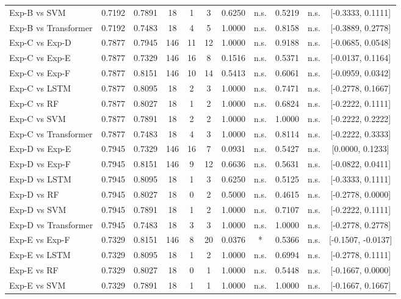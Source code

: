 \begin{table}[htbp]
{\begin{tabular}{l cc c cc cc cc c}
  Exp-B vs SVM & 0.7192 & 0.7891 & 18 & 1 & 3 & 0.6250 & n.s. & 0.5219 & n.s. & [-0.3333, 0.1111] \\
  Exp-B vs Transformer & 0.7192 & 0.7483 & 18 & 4 & 5 & 1.0000 & n.s. & 0.8158 & n.s. & [-0.3889, 0.2778] \\
  Exp-C vs Exp-D & 0.7877 & 0.7945 & 146 & 11 & 12 & 1.0000 & n.s. & 0.9188 & n.s. & [-0.0685, 0.0548] \\
  Exp-C vs Exp-E & 0.7877 & 0.7329 & 146 & 16 & 8 & 0.1516 & n.s. & 0.5371 & n.s. & [-0.0137, 0.1164] \\
  Exp-C vs Exp-F & 0.7877 & 0.8151 & 146 & 10 & 14 & 0.5413 & n.s. & 0.6061 & n.s. & [-0.0959, 0.0342] \\
  Exp-C vs LSTM & 0.7877 & 0.8095 & 18 & 2 & 3 & 1.0000 & n.s. & 0.7471 & n.s. & [-0.2778, 0.1667] \\
  Exp-C vs RF & 0.7877 & 0.8027 & 18 & 1 & 2 & 1.0000 & n.s. & 0.6824 & n.s. & [-0.2222, 0.1111] \\
  Exp-C vs SVM & 0.7877 & 0.7891 & 18 & 2 & 2 & 1.0000 & n.s. & 1.0000 & n.s. & [-0.2222, 0.2222] \\
  Exp-C vs Transformer & 0.7877 & 0.7483 & 18 & 4 & 3 & 1.0000 & n.s. & 0.8114 & n.s. & [-0.2222, 0.3333] \\
  Exp-D vs Exp-E & 0.7945 & 0.7329 & 146 & 16 & 7 & 0.0931 & n.s. & 0.5427 & n.s. & [0.0000, 0.1233] \\
  Exp-D vs Exp-F & 0.7945 & 0.8151 & 146 & 9 & 12 & 0.6636 & n.s. & 0.5631 & n.s. & [-0.0822, 0.0411] \\
  Exp-D vs LSTM & 0.7945 & 0.8095 & 18 & 1 & 3 & 0.6250 & n.s. & 0.5125 & n.s. & [-0.3333, 0.1111] \\
  Exp-D vs RF & 0.7945 & 0.8027 & 18 & 0 & 2 & 0.5000 & n.s. & 0.4615 & n.s. & [-0.2778, 0.0000] \\
  Exp-D vs SVM & 0.7945 & 0.7891 & 18 & 1 & 2 & 1.0000 & n.s. & 0.7107 & n.s. & [-0.2222, 0.1111] \\
  Exp-D vs Transformer & 0.7945 & 0.7483 & 18 & 3 & 3 & 1.0000 & n.s. & 1.0000 & n.s. & [-0.2778, 0.2778] \\
  Exp-E vs Exp-F & 0.7329 & 0.8151 & 146 & 8 & 20 & 0.0376 & * & 0.5366 & n.s. & [-0.1507, -0.0137] \\
  Exp-E vs LSTM & 0.7329 & 0.8095 & 18 & 1 & 2 & 1.0000 & n.s. & 0.6994 & n.s. & [-0.2778, 0.1111] \\
  Exp-E vs RF & 0.7329 & 0.8027 & 18 & 0 & 1 & 1.0000 & n.s. & 0.5448 & n.s. & [-0.1667, 0.0000] \\
  Exp-E vs SVM & 0.7329 & 0.7891 & 18 & 1 & 1 & 1.0000 & n.s. & 1.0000 & n.s. & [-0.1667, 0.1667] \\

\end{tabular}}
\end{table}
